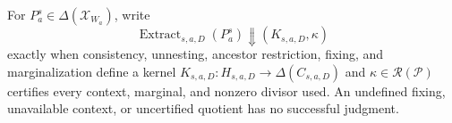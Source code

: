 For \(P_a^s\in\Delta(\mathcal X_{W_a})\), write \[\operatorname{Extract}_{s,a,D}(P_a^s)\Downarrow(K_{s,a,D},\kappa)\] exactly when consistency, unnesting, ancestor restriction, fixing, and marginalization define a kernel \(K_{s,a,D}:H_{s,a,D}\to\Delta(C_{s,a,D})\) and \(\kappa\in\mathscr R(\mathcal P)\) certifies every context, marginal, and nonzero divisor used. An undefined fixing, unavailable context, or uncertified quotient has no successful judgment.